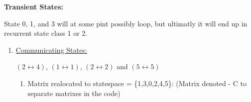 \documentclass[]{article}
\providecommand{\tightlist}{%
  \setlength{\itemsep}{0pt}\setlength{\parskip}{0pt}}
\begin{document}
\textbf{Transient States:}

State 0, 1, and 3 will at some pint possibly loop, but ultimatly it will
end up in recurrent state class 1 or 2.

\begin{enumerate}
\def\labelenumi{\alph{enumi})}
\setcounter{enumi}{2}
\item
  \underline{Communicating States:}

  \((2\leftrightarrow{4})\), \((1\leftrightarrow{1})\),
  \((2\leftrightarrow{2})\) and \((5\leftrightarrow{5})\)

  \begin{enumerate}
  \def\labelenumii{\alph{enumii})}
  \setcounter{enumii}{3}
  \tightlist
  \item
    Matrix realocated to statespace = \{1,3,0,2,4,5\}: (Matrix denoted -
    C to separate matrixes in the code)
  \end{enumerate}
\end{enumerate}
\end{document}
